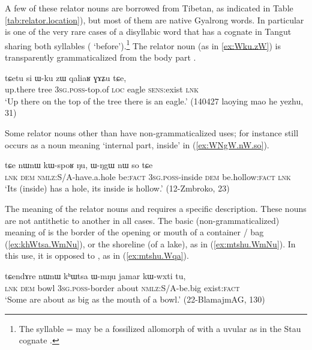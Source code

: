 A few of these relator nouns are borrowed from Tibetan, as indicated in Table \ref{tab:relator.location}), but most of them are native Gyalrong words. In particular  is one of the very rare cases of a disyllabic word that has a cognate in Tangut sharing both syllables ( `before').\footnote{The syllable  =  may be a fossilized allomorph of  with a uvular as in the Stau cognate .} The relator noun  (as in \ref{ex:Wku.zW}) is transparently grammaticalized from the body part .

\begin{exe}
\ex \label{ex:Wku.zW}
 \gll tɕetu si ɯ-ku zɯ qaliaʁ ɣɤʑu tɕe, \\
 up.there tree \textsc{3sg}.\textsc{poss}-top.of \textsc{loc} eagle \textsc{sens}:exist \textsc{lnk} \\
 \glt `Up there on the top of the tree there is an eagle.' (140427 laoying mao he yezhu, 31)
\end{exe}

Some relator nouns other than  have non-grammaticalized uses; for instance  still occurs as a noun meaning  `internal part, inside' in (\ref{ex:WNgW.nW.so}).

\begin{exe}
\ex \label{ex:WNgW.nW.so}
 \gll tɕe nɯnɯ kɯ-spoʁ ŋu, ɯ-ŋgɯ nɯ so tɕe  \\
 \textsc{lnk} \textsc{dem} \textsc{nmlz}:S/A-have.a.hole be:\textsc{fact} \textsc{3sg}.\textsc{poss}-inside \textsc{dem} be.hollow:\textsc{fact} \textsc{lnk} \\
 \glt `Its (inside) has a hole, its inside is hollow.' (12-Zmbroko, 23)
\end{exe}

The meaning of the relator nouns  and  requires a specific description. These nouns are not antithetic to another in all cases. The basic (non-grammaticalized) meaning of    is the border of the opening or mouth of a container / bag (\ref{ex:khWtsa.WmNu}), or the shoreline (of a lake), as in (\ref{ex:mtshu.WmNu}). In this use, it is opposed to , as in (\ref{ex:mtshu.Wqa}).

\begin{exe}
\ex \label{ex:khWtsa.WmNu}
\gll  tɕendɤre nɯnɯ kʰɯtsa ɯ-mŋu jamar kɯ-wxti tu,\\
\textsc{lnk} \textsc{dem} bowl \textsc{3sg}.\textsc{poss}-border about \textsc{nmlz}:S/A-be.big exist:\textsc{fact}\\
\glt  `Some are about as big as the mouth of a bowl.' (22-BlamajmAG, 130)
\end{exe}

